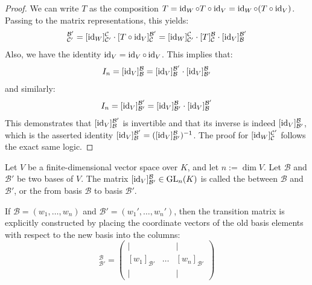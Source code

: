 \begin{proof}
We can write $T$ as the composition $T = \operatorname{id}_W \circ T \circ \operatorname{id}_V = \operatorname{id}_W \circ (T \circ \operatorname{id}_V)$. Passing to the matrix representations, this yields:
\begin{equation*}
    [T]_{\mathcal{C}'}^{\mathcal{B}'} = [\id_W]_{\mathcal{C}'}^{\mathcal{C}} \cdot [T \circ \id_V]_{\mathcal{C}}^{\mathcal{B}'} = [\id_W]_{\mathcal{C}'}^{\mathcal{C}} \cdot [T]_{\mathcal{C}}^{\mathcal{B}} \cdot [\id_V]_{\mathcal{B}}^{\mathcal{B}'}
\end{equation*}
Also, we have the identity $\operatorname{id}_V = \operatorname{id}_V \circ \operatorname{id}_V$. This implies that:
\begin{equation*}
    I_n = [\operatorname{id}_V]_{\mathcal{B}}^{\mathcal{B}} = [\operatorname{id}_V]_{\mathcal{B}}^{\mathcal{B}'} \cdot [\operatorname{id}_V]_{\mathcal{B}'}^{\mathcal{B}}
\end{equation*}
and similarly:
\begin{equation*}
    I_n = [\operatorname{id}_V]_{\mathcal{B}'}^{\mathcal{B}'} = [\operatorname{id}_V]_{\mathcal{B}'}^{\mathcal{B}} \cdot [\operatorname{id}_V]_{\mathcal{B}}^{\mathcal{B}'}
\end{equation*}
This demonstrates that $[\operatorname{id}_V]_{\mathcal{B}}^{\mathcal{B}'}$ is invertible and that its inverse is indeed $[\operatorname{id}_V]_{\mathcal{B}'}^{\mathcal{B}}$, which is the asserted identity $[\operatorname{id}_V]_{\mathcal{B}}^{\mathcal{B}'} = ([\operatorname{id}_V]_{\mathcal{B}'}^{\mathcal{B}})^{-1}$. The proof for $[\operatorname{id}_W]_{\mathcal{C}}^{\mathcal{C}'}$ follows the exact same logic.
\end{proof}

\begin{definition}
\label{def:change_of_basis_matrix}
Let $V$ be a finite-di\-men\-sional vector space over $K$, and let $n := \dim V$. Let $\mathcal{B}$ and $\mathcal{B}'$ be two bases of $V$. The matrix $[\operatorname{id}_V]_{\mathcal{B}'}^{\mathcal{B}} \in \operatorname{GL}_n(K)$ is called the  between $\mathcal{B}$ and $\mathcal{B}'$, or the  from basis $\mathcal{B}$ to basis $\mathcal{B}'$.
\end{definition}

\begin{remark}
If $\mathcal{B} = (w_1, \dots, w_n)$ and $\mathcal{B}' = (w_1', \dots, w_n')$, then the transition matrix is explicitly constructed by placing the coordinate vectors of the old basis elements with respect to the new basis into the columns:
\begin{equation*}
    [\id_V]_{\mathcal{B}'}^{\mathcal{B}} = \begin{pmatrix} | & & | \\ [w_1]_{\mathcal{B}'} & \dots & [w_n]_{\mathcal{B}'} \\ | & & | \end{pmatrix}
\end{equation*}
\end{remark}

